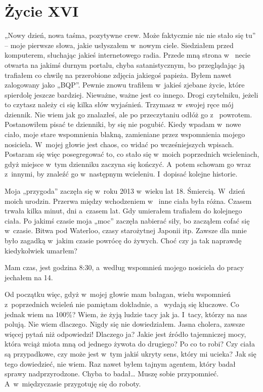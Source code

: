 \chapter{Życie XVI}

„Nowy dzień, nowa taśma, pozytywne crew. Może faktycznie nic nie stało się tu” -- moje pierwsze słowa, jakie 
usłyszałem w~nowym ciele. Siedziałem przed komputerem, słuchając jakieś internetowego radia. Przede mną strona w~
necie otwarta na jakimś durnym portalu, chyba satanistycznym, bo przeglądając ją trafiałem co chwilę na przerobione 
zdjęcia jakiegoś papieża. Byłem nawet zalogowany jako „BQP”. Pewnie znowu trafiłem w~jakieś zjebane życie, które 
spierdolę jeszcze bardziej. Nieważne, ważne jest co innego. Drogi czytelniku, jeżeli to czytasz należy ci się kilka 
słów wyjaśnień. Trzymasz w~swojej ręce mój dziennik. Nie wiem jak go znalazłeś, ale po przeczytaniu odłóż go z~
powrotem. Postanowiłem pisać te dzienniki, by się nie pogubić. Kiedy wpadam w~nowe ciało, moje stare wspomnienia 
blakną, zamieniane przez wspomnienia mojego nosiciela. W~mojej głowie jest chaos, co widać po wcześniejszych wpisach. 
Postaram się więc posegregować to, co stało się w~moich poprzednich wcieleniach, gdyż miejsce w~tym dzienniku zaczyna 
się kończyć. A~potem schowam go wraz z~innymi, by znaleźć go w~następnym wcieleniu. I~dopisać kolejne historie.

Moja „przygoda” zaczęła się w~roku 2013 w~wieku lat 18. Śmiercią. W~dzień moich urodzin. Przerwa między wchodzeniem w~
inne ciała była różna. Czasem trwała kilka minut, dni a~czasem lat. Gdy umierałem trafiałem do kolejnego ciała. Po 
jakimś czasie moja „moc” zaczęła nabierać siły, bo zacząłem cofać się w~czasie. Bitwa pod Waterloo, czasy starożytnej 
Japonii itp. Zawsze dla mnie było zagadką w~jakim czasie powrócę do żywych. Choć czy ja tak naprawdę kiedykolwiek 
umarłem?

Mam czas, jest godzina 8:30, a~według wspomnień mojego nosiciela do pracy jechałem na 14.

Od początku więc, gdyż w~mojej głowie mam bałagan, wielu wspomnień z~poprzednich wcieleń nie pamiętam dokładnie, a~
wydają się kluczowe. Co jednak wiem na 100\%? Wiem, że żyją ludzie tacy jak ja. I~tacy, którzy na nas polują. Nie 
wiem dlaczego. Nigdy się nie dowiedziałem. Jasna cholera, zawsze więcej pytań niż odpowiedzi! Dlaczego ja? Jakie jest 
źródło tajemniczej mocy, która wciąż miota mną od jednego żywota do drugiego? Po co to robi? Czy ciała są 
przypadkowe, czy może jest w~tym jakiś ukryty sens, który mi ucieka? Jak się tego dowiedzieć, nie wiem. Raz nawet 
byłem tajnym agentem, który badał sprawy nadprzyrodzone. Chyba to badał… Muszę sobie przypomnieć. A~w~międzyczasie 
przygotuję się do roboty.

